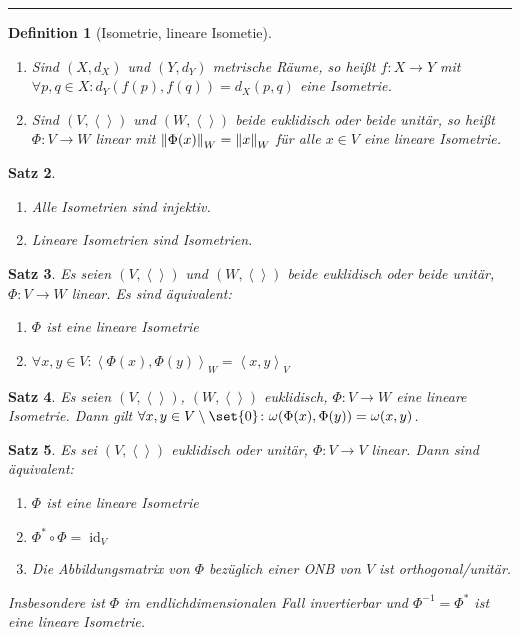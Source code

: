 \documentclass[a4paper]{article}
\newcounter{Sec}
\theoremstyle{marginbreak}
\newtheorem{definition}{Definition}[Sec]
\newtheorem{satz}[definition]{Satz}
\DeclareMathOperator{\id}{id}
\newcommand{\sep}{%
	\rule{\textwidth}{0.3pt}%
	\stepcounter{Sec}%
	}
\newcommand\scp[1]{\left\langle#1\right\rangle}
\begin{document}
	\sep
	\begin{definition}[Isometrie, lineare Isometie]
		\begin{enumerate}[label=(\alph*)]
			\item Sind $(X, d_X)$ und $(Y, d_Y)$ metrische Räume, so heißt $f\colon X\to Y$ mit
				$\forall p, q\in X\colon d_Y(f(p), f(q)) = d_X(p, q)$ eine Isometrie.
			\item Sind $(V, \scp{})$ und $(W, \scp{})$ beide euklidisch oder beide unitär,
				so heißt $\Phi\colon V\to W$ linear mit $\norm{\Phi(x)}_W=\norm{x}_W$
				für alle $x\in V$
				eine lineare Isometrie.
		\end{enumerate}
	\end{definition}
	\begin{satz}
		\begin{enumerate}[label=(\alph*)]
			\item Alle Isometrien sind injektiv.
			\item Lineare Isometrien sind Isometrien.
		\end{enumerate}
	\end{satz}
	\begin{satz}
		Es seien $(V, \scp{})$ und $(W, \scp{})$ beide euklidisch oder beide unitär,
		$\Phi\colon V\to W$ linear. Es sind äquivalent:
		\begin{enumerate}[label=(\alph*)]
			\item $\Phi$ ist eine lineare Isometrie
			\item $\forall x, y\in V\colon \scp{\Phi(x), \Phi(y)}_W = \scp{x, y}_V$
		\end{enumerate}
	\end{satz}
	\begin{satz}
		Es seien $(V, \scp{})$, $(W, \scp{})$ euklidisch, $\Phi\colon V\to W$ eine lineare
		Isometrie. Dann gilt $\forall x, y\in V\setminus\set{0}\colon \omega(\Phi(x), \Phi(y)) = \omega(x, y)$.
	\end{satz}
	\begin{satz}
		Es sei $(V, \scp{})$ euklidisch oder unitär, $\Phi\colon V\to V$ linear. Dann sind äquivalent:
		\begin{enumerate}[label=(\alph*)]
			\item $\Phi$ ist eine lineare Isometrie
			\item $\Phi^* \circ \Phi = \id_V$
			\item Die Abbildungsmatrix von $\Phi$ bezüglich einer ONB von $V$ ist orthogonal/unitär.
		\end{enumerate}
		Insbesondere ist $\Phi$ im endlichdimensionalen Fall invertierbar und $\Phi^{-1}=\Phi^*$ ist eine
		lineare Isometrie.
	\end{satz}
\end{document}
